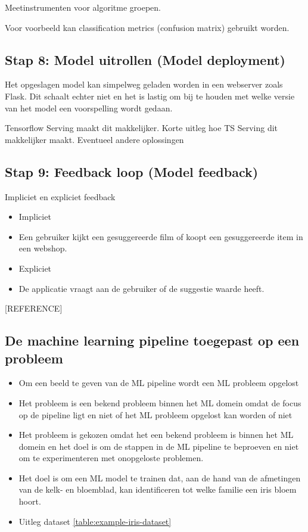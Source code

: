 Meetinstrumenten voor algoritme groepen.

Voor voorbeeld kan classification metrics (confusion matrix) gebruikt worden.

\subsection{Stap 8: Model uitrollen (Model deployment)}\label{subsec:model-uitrollen}
Het opgeslagen model kan simpelweg geladen worden in een webserver zoals Flask. Dit schaalt echter niet en het is lastig om bij te houden met welke versie van het model een voorspelling wordt gedaan.

Tensorflow Serving maakt dit makkelijker. Korte uitleg hoe TS Serving dit makkelijker maakt. Eventueel andere oplossingen

\subsection{Stap 9: Feedback loop (Model feedback)}\label{subsec:feebdack-loop}
Impliciet en expliciet feedback

\begin{itemize}
  \item Impliciet
  \item [] Een gebruiker kijkt een gesuggereerde film of koopt een gesuggereerde item in een webshop.
  \item Expliciet
  \item [] De applicatie vraagt aan de gebruiker of de suggestie waarde heeft.
\end{itemize}

[REFERENCE]

\subsection{De machine learning pipeline toegepast op een probleem}\label{subsec:de-machine-learning-pipeline-toegepast-op-een-probleem}
\begin{itemize}
  \item Om een beeld te geven van de ML pipeline wordt een ML probleem opgelost
  \item Het probleem is een bekend probleem binnen het ML domein omdat de focus op de pipeline ligt en niet of het ML probleem opgelost kan worden of niet
  \item Het probleem is gekozen omdat het een bekend probleem is binnen het ML domein en het doel is om de stappen in de ML pipeline te beproeven en niet om te experimenteren met onopgeloste problemen.
  \item Het doel is om een ML model te trainen dat, aan de hand van de afmetingen van de kelk- en bloemblad, kan identificeren tot welke familie een iris bloem hoort.
  \item Uitleg dataset \autoref{table:example-iris-dataset}
\end{itemize}

